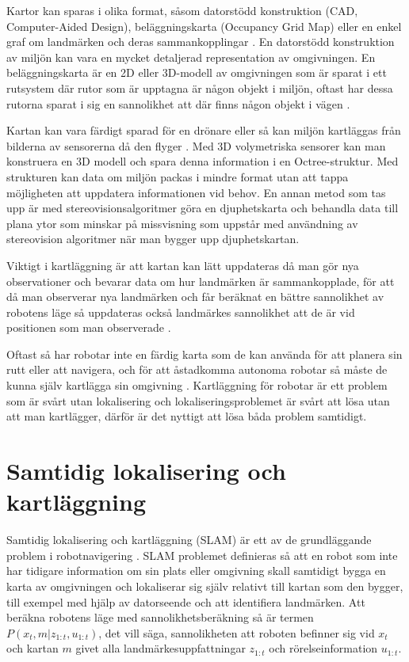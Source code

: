 Kartor kan sparas i olika format, såsom datorstödd konstruktion (CAD, Computer-Aided Design), beläggningskarta (Occupancy Grid Map) eller en enkel graf om landmärken och deras sammankopplingar \citep{982903}. En datorstödd konstruktion av miljön kan vara en mycket detaljerad representation av omgivningen. En beläggningskarta är en 2D eller 3D-modell av omgivningen som är sparat i ett rutsystem där rutor som är upptagna är någon objekt i miljön, oftast har dessa rutorna sparat i sig en sannolikhet att där finns någon objekt i vägen \citep{6095058, 982903}. 

Kartan kan vara färdigt sparad för en drönare eller så kan miljön kartläggas från bilderna av sensorerna då den flyger \citep{geospatial}. Med 3D volymetriska sensorer kan man konstruera en 3D modell och spara denna information i en Octree-struktur. Med strukturen kan data om miljön packas i mindre format utan att tappa möjligheten att uppdatera informationen vid behov. En annan metod som tas upp är med stereovisionsalgoritmer göra en djuphetskarta och behandla data till plana ytor som minskar på missvisning som uppstår med användning av stereovision algoritmer när man bygger upp djuphetskartan. 

Viktigt i kartläggning är att kartan kan lätt uppdateras då man gör nya observationer och bevarar data om hur landmärken är sammankopplade, för att då man observerar nya landmärken och får beräknat en bättre sannolikhet av robotens läge så uppdateras också landmärkes sannolikhet att de är vid positionen som man observerade \citep{globalsubmaps}.

Oftast så har robotar inte en färdig karta som de kan använda för att planera sin rutt eller att navigera, och för att åstadkomma autonoma robotar så måste de kunna själv kartlägga sin omgivning \citep{ProbabilisticRobotics}. Kartläggning för robotar är ett problem som är svårt utan lokalisering och lokaliseringsproblemet är svårt att lösa utan att man kartlägger, därför är det nyttigt att lösa båda problem samtidigt. 

\chapter{Samtidig lokalisering och kartläggning}

Samtidig lokalisering och kartläggning (SLAM) är ett av de grundläggande problem i robotnavigering \citep{realslamproblem}. SLAM problemet definieras så att en robot som inte har tidigare information om sin plats eller omgivning skall samtidigt bygga en karta av omgivningen och lokaliserar sig själv relativt till kartan som den bygger, till exempel med hjälp av datorseende och att identifiera landmärken. Att beräkna robotens läge med sannolikhetsberäkning så är termen $P(x_t, m|z_{1:t}, u_{1:t})$, det vill säga, sannolikheten att roboten befinner sig vid $x_t$ och kartan $m$ givet alla landmärkesuppfattningar $z_{1:t}$ och rörelseinformation $u_{1:t}$. 

